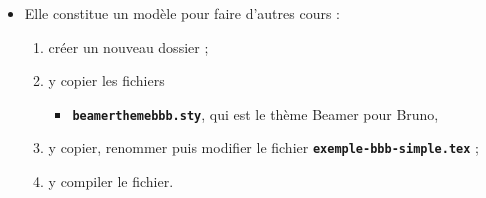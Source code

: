   \begin{itemize}
  \item Elle constitue un modèle pour faire d'autres cours :
      
    \begin{enumerate}
    \item créer un nouveau dossier ;
    \item y copier les fichiers 
      
      \begin{itemize}
      \item \texttt{\textbf{beamerthemebbb.sty}}, qui est le thème Beamer pour Bruno,
      \end{itemize}
      
    \item y copier, renommer puis modifier le fichier \texttt{\textbf{exemple-bbb-simple.tex}} ;
    \item y compiler le fichier.
    \end{enumerate}
  \end{itemize}
